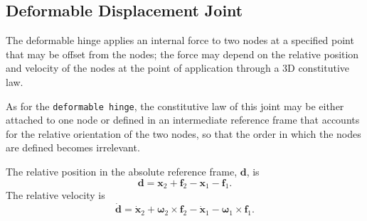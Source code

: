 \documentclass[10pt,dvips,fleqn]{report}
\newcommand{\T}[1]{\boldsymbol{#1}}
\begin{document}
\subsection{Deformable Displacement Joint}
The deformable hinge applies an internal force to two nodes at a specified 
point that may be offset from the nodes; the force may depend on the relative
position and velocity of the nodes at the point of application
through a 3D constitutive law.

As for the \texttt{deformable hinge}, the constitutive law of this joint
may be either attached to one node or defined in an intermediate
reference frame that accounts for the relative orientation of the two nodes,
so that the order in which the nodes are defined becomes irrelevant.

The relative position in the absolute reference frame, $\T{d}$, is
\begin{equation}
	\T{d} = \T{x}_2 + \T{f}_2 - \T{x}_1 - \T{f}_1 .
\end{equation}
The relative velocity is
\begin{equation}
	\dot{\T{d}} = \dot{\T{x}}_2 + \T{\omega}_2 \times \T{f}_2
		- \dot{\T{x}}_1 - \T{\omega}_1 \times \T{f}_1 .
\end{equation}
\end{document}
